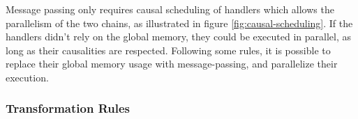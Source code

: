 Message passing only requires causal scheduling of handlers which allows the parallelism of the two chains, as illustrated  in figure \ref{fig:causal-scheduling}.
If the handlers didn't rely on the global memory, they could be executed in parallel, as long as their causalities are respected.
Following some rules, it is possible to replace their global memory usage with message-passing, and parallelize their execution.

\subsubsection{Transformation Rules}

\begin{figure}%
  \centering{}%
\end{figure}

